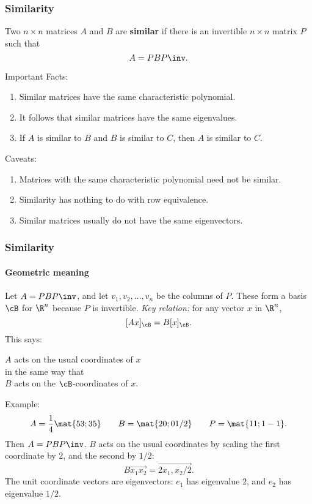 \begin{frame}
\frametitle{Similarity}

\vskip-3mm
\begin{defn}
  Two $n\times n$ matrices $A$ and $B$ are \textbf{similar} if there is an
  invertible $n\times n$ matrix $P$ such that
  \[ A = PBP\inv. \]
\end{defn}

\pause
\alert{Important Facts:}
\pause
\begin{enumerate}
\item Similar matrices have the same characteristic polynomial.
\pause
\item It follows that similar matrices have the same eigenvalues.
\pause
\item If $A$ is similar to $B$ and $B$ is similar to $C$, then $A$ is similar to
  $C$. 
\end{enumerate}

\pause\medskip
\alert{Caveats:}
\pause
\begin{enumerate}
\item Matrices with the same characteristic polynomial need not be similar.
\pause
\item Similarity has nothing to do with row equivalence.
\pause
\item Similar matrices usually do not have the same eigenvectors.
\end{enumerate}

\end{frame}



\begin{frame}
\frametitle{Similarity}
\framesubtitle{Geometric meaning}

Let $A = PBP\inv$, and let $v_1,v_2,\ldots,v_n$ be the columns of $P$.
\pause
These form a basis $\cB$ for $\R^n$ because $P$ is invertible.
\pause
\emph{Key relation:} for any vector $x$ in $\R^n$,
\[ [Ax]_\cB = B[x]_\cB. \]
\pause
This says:
\begin{center}
  $A$ acts on the usual coordinates of $x$\\
  in the same way that\\
  $B$ acts on the $\cB$-coordinates of $x$.
\end{center}

\pause\smallskip
\alert{Example:}
\vskip-2mm
\[ A = \frac 14\mat{5 3; 3 5} \qquad
B = \mat{2 0; 0 1/2} \qquad
P = \mat{1 1; 1 -1}. \]
\pause
Then $A=PBP\inv$.
\pause
$B$ acts on the usual coordinates by
\pause
scaling the first coordinate by $2$, and the second by $1/2$:
\displayskips{3pt}
\[ B\vec{x_1 x_2} = \vec{2x_1, x_2/2}. \]
\pause
The unit coordinate vectors are eigenvectors: $e_1$ has eigenvalue
\pause
$2$, and $e_2$ has eigenvalue
\pause
$1/2$.

\end{frame}


